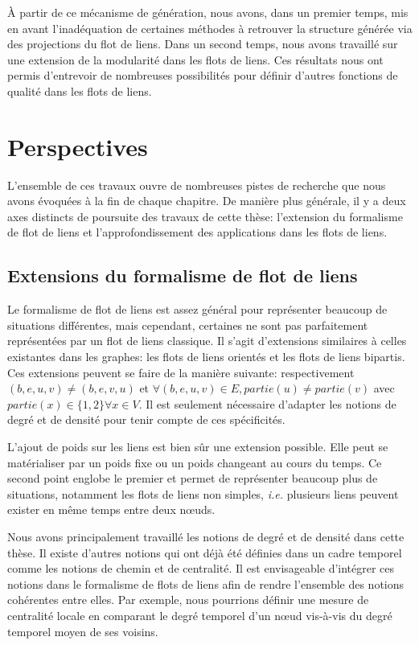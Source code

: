 \`A partir de ce mécanisme de génération, nous avons, dans un premier temps, mis en avant l'inadéquation de certaines méthodes à retrouver la structure générée via des projections du flot de liens.
Dans un second temps, nous avons travaillé sur une extension de la modularité dans les flots de liens.
Ces résultats nous ont permis d'entrevoir de nombreuses possibilités pour définir d'autres fonctions de qualité dans les flots de liens.

\section{Perspectives}

L'ensemble de ces travaux ouvre de nombreuses pistes de recherche que nous avons évoquées à la fin de chaque chapitre.
De manière plus générale, il y a deux axes distincts de poursuite des travaux de cette thèse: l'extension du formalisme de flot de liens et l'approfondissement des applications dans les flots de liens.

\subsection{Extensions du formalisme de flot de liens}

Le formalisme de flot de liens est assez général pour représenter beaucoup de situations différentes, mais cependant, certaines ne sont pas parfaitement représentées par un flot de liens classique.
Il s'agit d'extensions similaires à celles existantes dans les graphes: les flots de liens orientés et les flots de liens bipartis.
Ces extensions peuvent se faire de la manière suivante: respectivement $(b,e,u,v)\neq (b,e,v,u)$ et $\forall (b,e,u,v) \in E, partie(u)\neq partie(v)$ avec $partie(x) \in \{1,2\} \forall x \in V$.
Il est seulement nécessaire d'adapter les notions de degré et de densité pour tenir compte de ces spécificités.

\bigskip

L'ajout de poids sur les liens est bien sûr une extension possible.
Elle peut se matérialiser par un poids fixe ou un poids changeant au cours du temps.
Ce second point englobe le premier et permet de représenter beaucoup plus de situations, notamment les flots de liens non simples, \emph{i.e.} plusieurs liens peuvent exister en même temps entre deux n\oe{}uds.

\bigskip

Nous avons principalement travaillé les notions de degré et de densité dans cette thèse.
Il existe d'autres notions qui ont déjà été définies dans un cadre temporel comme les notions de chemin et de centralité.
Il est envisageable d'intégrer ces notions dans le formalisme de flots de liens afin de rendre l'ensemble des notions cohérentes entre elles.
Par exemple, nous pourrions définir une mesure de centralité locale en comparant le degré temporel d'un n\oe{}ud vis-à-vis du degré temporel moyen de ses voisins.

